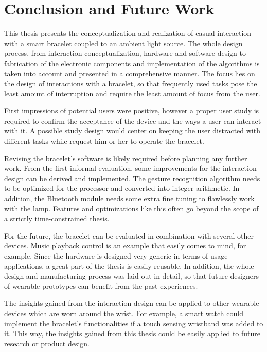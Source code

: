 \chapter{Conclusion and Future Work}

This thesis presents the conceptualization and realization of casual interaction with a smart bracelet coupled to an ambient light source. The whole design process, from interaction conceptualization, hardware and software design to fabrication of the electronic components and implementation of the algorithms is taken into account and presented in a comprehensive manner. The focus lies on the design of interactions with a bracelet, so that frequently used tasks pose the least amount of interruption and require the least amount of focus from the user.

First impressions of potential users were positive, however a proper user study is required to confirm the acceptance of the device and the ways a user can interact with it. A possible study design would center on keeping the user distracted with different tasks while request him or her to operate the bracelet.

Revising the bracelet's software is likely required before planning any further work. From the first informal evaluation, some improvements for the interaction design can be derived and implemented. The gesture recognition algorithm needs to be optimized for the processor and converted into integer arithmetic. In addition, the Bluetooth module needs some extra fine tuning to flawlessly work with the lamp. Features and optimizations like this often go beyond the scope of a strictly time-constrained thesis.

For the future, the bracelet can be evaluated in combination with several other devices. Music playback control is an example that easily comes to mind, for example. Since the hardware is designed very generic in terms of usage applications, a great part of the thesis is easily reusable. In addition, the whole design and manufacturing process was laid out in detail, so that future designers of wearable prototypes can benefit from the past experiences.

The insights gained from the interaction design can be applied to other wearable devices which are worn around the wrist. For example, a smart watch could implement the bracelet's functionalities if a touch sensing wristband was added to it. This way, the insights gained from this thesis could be easily applied to future research or product design.

